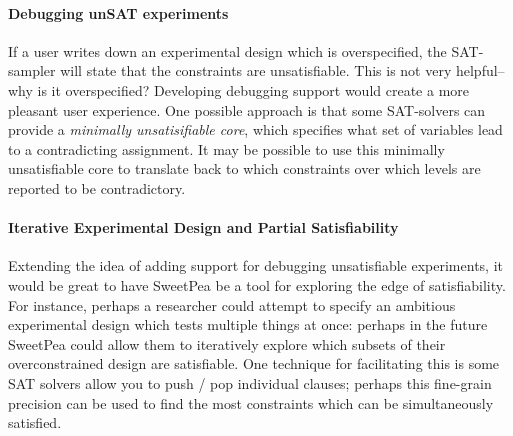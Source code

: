 \paragraph*{Debugging unSAT experiments}

If a user writes down an experimental design which is overspecified, the SAT-sampler will state that the constraints are unsatisfiable. This is not very helpful-- why is it overspecified? Developing debugging support would create a more pleasant user experience. One possible approach is that some SAT-solvers can provide a \emph{minimally unsatisifiable core}, which specifies what set of variables lead to a contradicting assignment. It may be possible to use this minimally unsatisfiable core to translate back to which constraints over which levels are reported to be contradictory.

\paragraph*{Iterative Experimental Design and Partial Satisfiability}

Extending the idea of adding support for debugging unsatisfiable experiments, it would be great to have SweetPea be a tool for exploring the edge of satisfiability. For instance, perhaps a researcher could attempt to specify an ambitious experimental design which tests multiple things at once: perhaps in the future SweetPea could allow them to iteratively explore which subsets of their overconstrained design are satisfiable. One technique for facilitating this is some SAT solvers allow you to push / pop individual clauses; perhaps this fine-grain precision can be used to find the most constraints which can be simultaneously satisfied.

%
%
%
%
